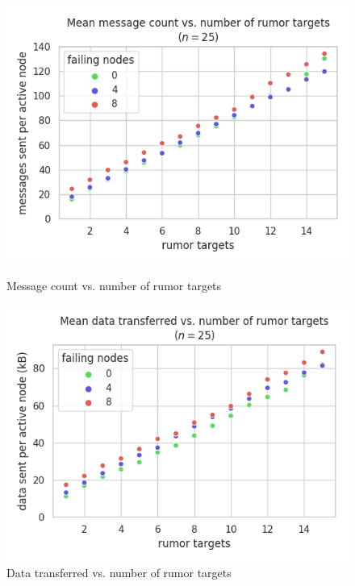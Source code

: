 \begin{figure}[H]
    \centering
    \begin{minipage}{0.5\textwidth}
        \centering
        \includegraphics[width=\textwidth]{figures/7/bandwidth_msg_tx_sum_by_rumor_targets.png}
        \captionsetup{labelformat=empty}
        \caption{Message count vs. number of rumor targets}
    \end{minipage}\hfill
    \begin{minipage}{0.5\textwidth}
        \centering
        \includegraphics[width=\textwidth]{figures/7/bandwidth_tx_sum_by_rumor_targets.png}
        \captionsetup{labelformat=empty}
        \caption{Data transferred vs. number of rumor targets}
    \end{minipage}\hfill
\end{figure}


